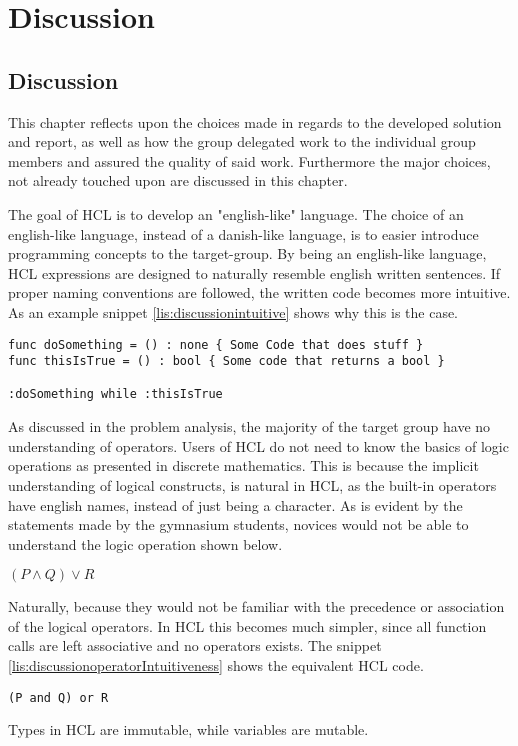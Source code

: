 \chapter{Discussion}
\section{Discussion}
This chapter reflects upon the choices made in regards to the developed solution and report, as well as how the group delegated work to the individual group members and assured the quality of said work.
Furthermore the major choices, not already touched upon are discussed in this chapter.

The goal of HCL is to develop an "english-like" language.
The choice of an english-like language, instead of a danish-like language, is to easier introduce programming concepts to the target-group.
By being an english-like language, HCL expressions are designed to naturally resemble english written sentences.
If proper naming conventions are followed, the written code becomes more intuitive.
As an example snippet \ref{lis:discussionintuitive} shows why this is the case.

\begin{lstlisting}[language=HCL,label=lis:discussionintuitive,firstnumber=1,caption=Example of the intuitive nature of HCL]
func doSomething = () : none { Some Code that does stuff }
func thisIsTrue = () : bool { Some code that returns a bool }

:doSomething while :thisIsTrue
\end{lstlisting}

As discussed in the problem analysis, the majority of the target group have no understanding of operators.
Users of HCL do not need to know the basics of logic operations as presented in discrete mathematics.
This is because the implicit understanding of logical constructs, is natural in HCL, as the built-in operators have english names, instead of just being a character.
As is evident by the statements made by the gymnasium students, novices would not be able to understand the logic operation shown below.
\begin{center}
	$(P \wedge Q) \vee R$
\end{center}
Naturally, because they would not be familiar with the precedence or association of the logical operators.
In HCL this becomes much simpler, since all function calls are left associative and no operators exists.
The snippet \ref{lis:discussionoperatorIntuitiveness} shows the equivalent HCL code.
\begin{lstlisting}[language=HCL,label=lis:discussionoperatorIntuitiveness,firstnumber=1,caption=Example of the intuitive nature of HCL]
(P and Q) or R
\end{lstlisting}
Types in HCL are immutable, while variables are mutable.

